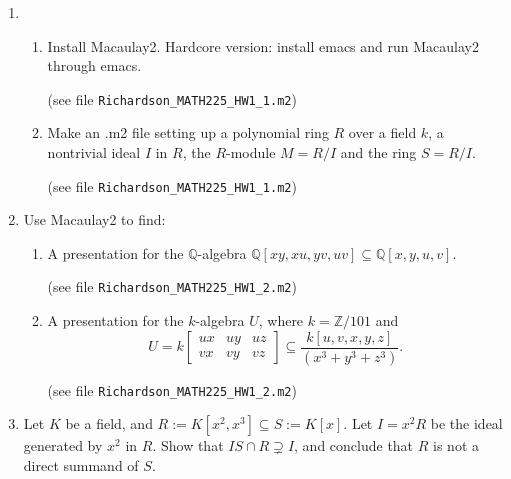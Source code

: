 \documentclass[11pt,oneside,english]{amsart}
\theoremstyle{definition}
\newcommand{\lspace}{\vspace{5mm}}
\newcommand{\MB}[1]{\mathbb{#1}}
\begin{document}
\rightline{\today}

\lspace




\begin{enumerate}[leftmargin=*]
\itemsep5mm


\item \begin{enumerate}
\itemsep5mm

\item Install Macaulay2. Hardcore version: install emacs and run Macaulay2 through emacs.

(see file \verb!Richardson_MATH225_HW1_1.m2!)

\item Make an .m2 file setting up a polynomial ring $R$ over a field $k$, a nontrivial ideal $I$ in $R$, the
$R$-module $M=R/I$ and the ring $S=R/I$.

(see file \verb!Richardson_MATH225_HW1_1.m2!)

\end{enumerate}

\item Use Macaulay2 to find:

\begin{enumerate}
\itemsep5mm

\item A presentation for the $\MB{Q}$-algebra $\MB{Q}[xy, xu, yv, uv]\subseteq \MB{Q}[x, y, u, v]$.

(see file \verb!Richardson_MATH225_HW1_2.m2!)

\item A presentation for the $k$-algebra $U$, where $k = \MB{Z}/101$ and
\[
U=k\begin{bmatrix}ux & uy & uz \\ vx & vy & vz\end{bmatrix}\subseteq\frac{k[u,v,x,y,z]}{(x^3+y^3+z^3)}.
\]

(see file \verb!Richardson_MATH225_HW1_2.m2!)
\end{enumerate}

\item Let $K$ be a field, and $R := K[x^2, x^3] \subseteq S := K[x]$. Let $I =x^2R$ be the ideal generated by $x^2$ in $R$. Show that $IS\cap R\supsetneq I$, and conclude that $R$ is not a direct summand of $S$.


\end{enumerate}
\end{document}
